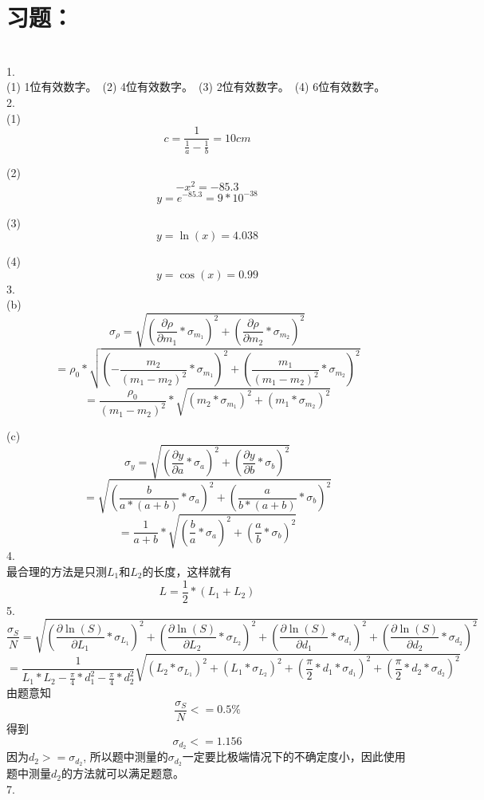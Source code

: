 \documentclass[a4paper,11pt]{article}
\begin{document}
	
\section{习题：}
\ \\
1.\\ 

(1) 1位有效数字。\ (2) 4位有效数字。\ (3) 2位有效数字。\ (4) 6位有效数字。\\
2.\\

(1)$$ c=\dfrac{1}{\frac{1}{a} - \frac{1}{b}} = 10 cm $$

(2)$$ -x^{2} = - 85.3 $$
$$ y = e^{- 85.3} = 9 * 10^{-38} $$

(3)$$ y = \ln(x) = 4.038 $$

(4)$$ y = \cos(x) = 0.99$$
3.\\

(b)$$ \sigma_{\rho} = \sqrt{(\dfrac{\partial \rho}{\partial m_{1}} * \sigma_{m_{1}})^{2} + (\dfrac{\partial \rho}{\partial m_{2}} * \sigma_{m_{2}})^{2}  } $$
$$ = \rho_{0}*\sqrt{(- \dfrac{m_{2}}{(m_{1}-m_{2})^{2}} * \sigma_{m_{1}})^{2} + (\dfrac{m_{1}}{(m_{1}-m_{2})^{2}} * \sigma_{m_{2}})^{2}  }$$
$$ = \dfrac{\rho_{0}}{(m_{1}-m_{2})^{2}}*\sqrt{({m_{2}} * \sigma_{m_{1}})^{2} + ( {m_{1}}  * \sigma_{m_{2}})^{2}  }$$

(c)$$ \sigma_{y} = \sqrt{(\dfrac{\partial y}{\partial a} * \sigma_{a})^{2} + (\dfrac{\partial y}{\partial b} * \sigma_{b})^{2}  } $$
$$  = \sqrt{(\dfrac{b}{a * ( a + b )} * \sigma_{a})^{2} + (\dfrac{a}{b * ( a + b )} * \sigma_{b})^{2}  } $$
$$  = \dfrac{1}{a + b}*\sqrt{(\dfrac{b}{a} * \sigma_{a})^{2} + (\dfrac{a}{b} * \sigma_{b})^{2}  } $$
4.\\

最合理的方法是只测$L_{1}$和$L_{2}$的长度，这样就有$$L = \frac{1}{2}*(L_{1} + L_{2})$$
5.\\
$$ \dfrac{\sigma_{S}}{N} = \sqrt{(\dfrac{\partial \ln(S)}{\partial L_{1}} * \sigma_{L_{1}})^{2} + (\dfrac{\partial \ln(S)}{\partial L_{2}} * \sigma_{L_{2}})^{2} + (\dfrac{\partial \ln(S)}{\partial d_{1}} * \sigma_{d_{1}})^{2} + (\dfrac{\partial \ln(S)}{\partial d_{2}} * \sigma_{d_{2}})^{2} } $$
$$ = \dfrac{1}{L_{1}*L_{2} - \frac{\pi}{4} * d_{1}^{2} - \frac{\pi}{4} * d_{2}^{2}}\sqrt{(L_{2} * \sigma_{L_{1}})^{2} + (L_{1} * \sigma_{L_{2}})^{2} + (\dfrac{\pi}{2} * d_{1}* \sigma_{d_{1}})^{2} + (\dfrac{\pi}{2} *d_{2} * \sigma_{d_{2}})^{2} } $$
由题意知
$$ \dfrac{\sigma_{S}}{N} <= 0.5\% $$
得到$$ \sigma_{d_{2}} <= 1.156 $$
因为$ d_{2} >= \sigma_{d_{2}} $, 所以题中测量的$ \sigma_{d_{2}} $一定要比极端情况下的不确定度小，因此使用题中测量$ d_{2}  $的方法就可以满足题意。  \\
7.\\
\end{document}
